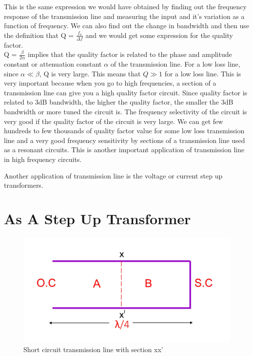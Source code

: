 This is the same expression we would have obtained by finding out the frequency response of the transmission line and measuring  the input and it's variation as a function of frequency. We can also find out the change in bandwidth and then use the definition that Q = $\frac{f_{o}}{\Delta f}$ and we would get some expression for the quality factor.\\ Q = $ \frac{\beta}{2\alpha}$ implies that the quality factor is related to the phase and amplitude constant or attenuation constant $ \alpha$ of the transmission line. For a low loss line, since $ \alpha \ll \beta$, Q is very large. This means that $Q \gg 1$ for a low loss line. This is very important because when you go to high frequencies, a section of a transmission line can give you a high quality factor circuit. Since quality factor is related to 3dB bandwidth, the higher the quality factor, the smaller the 3dB bandwidth or more tuned the circuit is. The frequency selectivity of the circuit is very good if the quality factor of the circuit is very large. We can get few hundreds to few thousands of quality factor value for some low loss transmission line and a very good frequency sensitivity by sections of a transmission line used as a resonant circuits. This is another important application of transmission line in high frequency circuits.

Another application of transmission line is the voltage or current step up transformers. 
\section{As A Step Up Transformer}
\begin{figure}[h]
\centering
\includegraphics[width=1\linewidth]{./graphics/fig5}
\caption{Short circuit transmission line with section xx'}
\end{figure}

